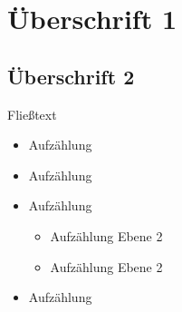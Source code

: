 \documentclass[parskip=true]{scrartcl}
\begin{document}



\section{Überschrift 1}\label{sec:1}
\subsection{Überschrift 2}
Fließtext
\begin{itemize}
	\item Aufzählung 
	\item Aufzählung 
	\item Aufzählung
	\begin{itemize}
	 \item Aufzählung Ebene 2
	 \item Aufzählung Ebene 2
	\end{itemize}
\item Aufzählung
\end{itemize}
\lipsum[1-5]
\end{document}
